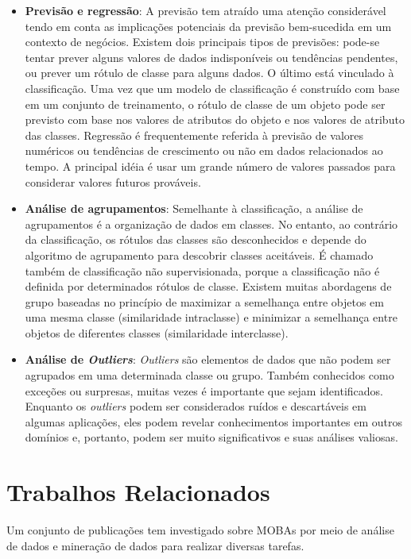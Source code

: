 \begin{itemize}
  \item 
\textbf{Previsão e regressão}: A previsão tem atraído uma atenção considerável tendo em conta as implicações potenciais da previsão bem-sucedida em um contexto de negócios. Existem dois principais tipos de previsões: pode-se tentar prever alguns valores de dados indisponíveis ou tendências pendentes, ou prever um rótulo de classe para alguns dados. O último está vinculado à classificação. Uma vez que um modelo de classificação é construído com base em um conjunto de treinamento, o rótulo de classe de um objeto pode ser previsto com base nos valores de atributos do objeto e nos valores de atributo das classes. Regressão é frequentemente referida à previsão de valores numéricos ou tendências de crescimento ou não em dados relacionados ao tempo. A principal idéia é usar um grande número de valores passados para considerar valores futuros prováveis.  
  \item 
\textbf{Análise de agrupamentos}: Semelhante à classificação, a análise de agrupamentos é a organização de dados em classes. No entanto, ao contrário da classificação, os rótulos das classes são desconhecidos e depende do algoritmo de agrupamento para descobrir classes aceitáveis. É chamado também de classificação não supervisionada, porque a classificação não é definida por determinados rótulos de classe. Existem muitas abordagens de grupo baseadas no princípio de maximizar a semelhança entre objetos em uma mesma classe (similaridade intraclasse) e minimizar a semelhança entre objetos de diferentes classes (similaridade interclasse).
  \item 
\textbf{Análise de \textit{Outliers}}: \textit{Outliers} são elementos de dados que não podem ser agrupados em uma determinada classe ou grupo. Também conhecidos como exceções ou surpresas, muitas vezes é importante que sejam identificados. Enquanto os \textit{outliers} podem ser considerados ruídos e descartáveis em algumas aplicações, eles podem revelar conhecimentos importantes em outros domínios e, portanto, podem ser muito significativos e suas análises valiosas.

\end{itemize}

\chapter{Trabalhos Relacionados}

Um conjunto de publicações tem investigado sobre MOBAs por meio de análise de dados e mineração de dados para realizar diversas tarefas.

